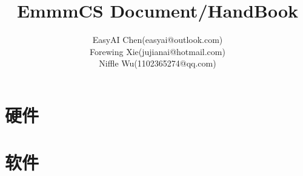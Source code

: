 \documentclass[10pt,fancyhdr,UTF8]{ctexbook}
\title{EmmmCS Document/HandBook}
\author{
        EasyAI Chen(easyai@outlook.com)\\
        Forewing Xie(jujianai@hotmail.com)\\
        Niffle Wu(1102365274@qq.com)
    }
\begin{document}
\begin{sloppypar}
\maketitle
\tableofcontents
\mainmatter

\part{硬件}






\part{软件}





\end{sloppypar}
\end{document}
